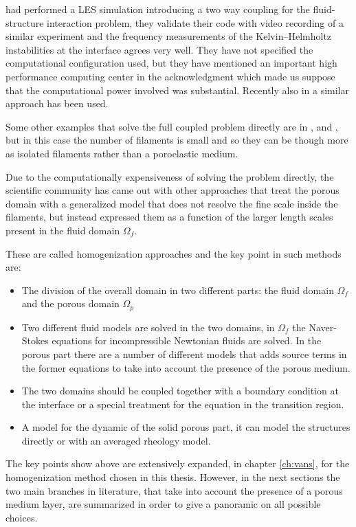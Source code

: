\citet{dupont2010modelling} had performed a LES simulation introducing a two way coupling for the fluid-structure interaction problem, they validate their code with video recording of a similar experiment and the frequency measurements of the Kelvin–Helmholtz instabilities at the interface agrees very well.
They have not specified the computational configuration used, but they have mentioned an important high performance computing center in the acknowledgment which made us suppose that the computational power involved was substantial.
Recently also in \citet{marjoribanks2017does} a similar approach has been used.

Some other examples that solve the full coupled problem directly are in \citet{pinelli2017pelskin}, \citet{favier2017pelskin} and \citet{revell2017pelskin}, but in this case the number of filaments is small and so they can be though more as isolated filaments rather than a poroelastic medium.

Due to the computationally expensiveness of solving the problem directly, the scientific community has came out with other approaches that treat the porous domain with a generalized model that does not resolve the fine scale inside the filaments, but instead expressed them as a function of the larger length scales present in the fluid domain $\Omega_{f}$.

These are called homogenization approaches and the key point in such methods are:
\begin{itemize}
	\item The division of the overall domain in two different parts: the fluid domain $\Omega_{f}$ and the porous domain $\Omega_{p}$
	\item Two different fluid models are solved in the two domains, in $\Omega_{f}$ the Naver-Stokes equations for incompressible Newtonian fluids are solved. In the porous part there are a number of different models that adds source terms in the former equations to take into account the presence of the porous medium.
	\item The two domains should be coupled together with a boundary condition at the interface or a special treatment for the equation in the transition region.
	\item A model for the dynamic of the solid porous part, it can model the structures directly or with an averaged rheology model.
\end{itemize}

The key points show above are extensively expanded, in chapter \ref{ch:vans}, for the homogenization method chosen in this thesis.
However, in the next sections the two main branches in literature, that take into account the presence of a porous medium layer, are summarized in order to give a panoramic on all possible choices.


